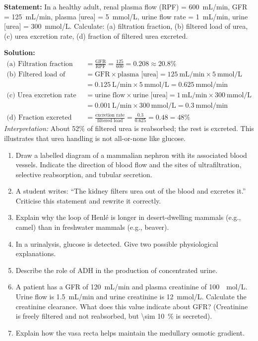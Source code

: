 \documentclass[11pt]{article}
\begin{document}
\begin{exoresolu}
\textbf{Statement:} In a healthy adult, renal plasma flow (RPF) = \SI{600}{mL/min}, GFR = \SI{125}{mL/min}, plasma [urea] = \SI{5}{mmol/L}, urine flow rate = \SI{1}{mL/min}, urine [urea] = \SI{300}{mmol/L}. Calculate: (a) filtration fraction, (b) filtered load of urea, (c) urea excretion rate, (d) fraction of filtered urea excreted.

\textbf{Solution:}
\begin{align*}
\text{(a) Filtration fraction} &= \frac{\text{GFR}}{\text{RPF}} = \frac{125}{600} = 0.208 \approx 20.8\% \\[4pt]
\text{(b) Filtered load of urea} &= \text{GFR} \times \text{plasma [urea]} = 125\ \mathrm{mL/min} \times 5\ \mathrm{mmol/L} \\
&= 0.125\ \mathrm{L/min} \times 5\ \mathrm{mmol/L} = 0.625\ \mathrm{mmol/min} \\[4pt]
\text{(c) Urea excretion rate} &= \text{urine flow} \times \text{urine [urea]} = 1\ \mathrm{mL/min} \times 300\ \mathrm{mmol/L} \\
&= 0.001\ \mathrm{L/min} \times 300\ \mathrm{mmol/L} = 0.3\ \mathrm{mmol/min} \\[4pt]
\text{(d) Fraction excreted} &= \frac{\text{excretion rate}}{\text{filtered load}} = \frac{0.3}{0.625} = 0.48 = 48\%
\end{align*}
\textit{Interpretation:} About 52\% of filtered urea is reabsorbed; the rest is excreted. This illustrates that urea handling is not all-or-none like glucose.
\end{exoresolu}

\begin{exercice}
\begin{enumerate}
\item Draw a labelled diagram of a mammalian nephron with its associated blood vessels. Indicate the direction of blood flow and the sites of ultrafiltration, selective reabsorption, and tubular secretion.
\item A student writes: ``The kidney filters urea out of the blood and excretes it.'' Criticise this statement and rewrite it correctly.
\item Explain why the loop of Henlé is longer in desert-dwelling mammals (e.g., camel) than in freshwater mammals (e.g., beaver).
\item In a urinalysis, glucose is detected. Give two possible physiological explanations.
\item Describe the role of ADH in the production of concentrated urine.
\item A patient has a GFR of \SI{120}{mL/min} and plasma creatinine of \SI{100}{\mu mol/L}. Urine flow is \SI{1.5}{mL/min} and urine creatinine is \SI{12}{mmol/L}. Calculate the creatinine clearance. What does this value indicate about GFR? (Creatinine is freely filtered and not reabsorbed, but \SI{\sim 10}{\%} is secreted).
\item Explain how the vasa recta helps maintain the medullary osmotic gradient.
\end{enumerate}
\end{exercice}
\end{document}
